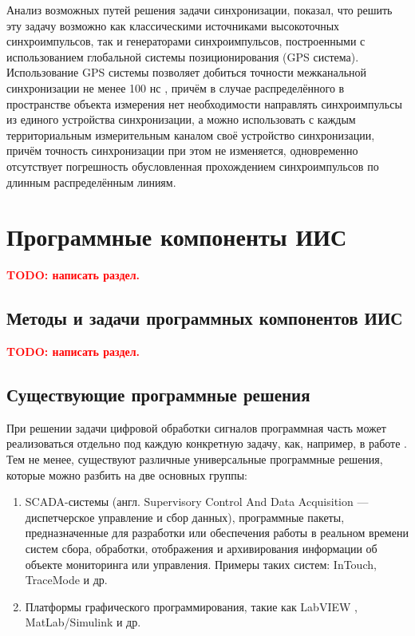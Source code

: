 \documentclass[a4paper, 14pt, titlepage]{extarticle}
\newcommand{\todo}[1]{\textbf{\textcolor{red}{TODO: #1}}}
\let\oldsection\section
\renewcommand{\section}{\newpage\oldsection}
\begin{document}

  Анализ возможных путей решения задачи синхронизации, показал, что решить эту задачу возможно как
  классическими источниками высокоточных синхроимпульсов, так и генераторами синхроимпульсов,
  построенными с использованием глобальной системы позиционирования (GPS система). Использование GPS
  системы позволяет добиться точности межканальной синхронизации не менее 100 нс \cite{lombardi-gps}, причём в случае
  распределённого в пространстве объекта измерения нет необходимости направлять синхроимпульсы из
  единого устройства синхронизации, а можно использовать с каждым территориальным измерительным
  каналом своё устройство синхронизации, причём точность синхронизации при этом не изменяется,
  одновременно отсутствует погрешность обусловленная прохождением синхроимпульсов по длинным
  распределённым линиям.

  \section{Программные компоненты ИИС}

  \todo{написать раздел.}

  \subsection{Методы и задачи программных компонентов ИИС}

  \todo{написать раздел.}

  \subsection{Существующие программные решения}\label{ssec:existing}

  При решении задачи цифровой обработки сигналов программная часть может реализоваться отдельно под
  каждую конкретную задачу, как, например, в работе \cite{bak-autometry}.
  Тем не менее, существуют различные универсальные программные решения, которые можно разбить на две
  основных группы:
  \begin{enumerate}
    \item SCADA-системы (англ. Supervisory Control And Data Acquisition — диспетчерское управление и
      сбор данных), программные пакеты, предназначенные для разработки или обеспечения работы в
      реальном времени систем сбора, обработки, отображения и архивирования информации об объекте
      мониторинга или управления. \cite{boyer-scada}
      Примеры таких систем: InTouch, TraceMode и др.
    \item Платформы графического программирования, такие как LabVIEW \cite{lavrov-labview}, MatLab/Simulink и др.
  \end{enumerate}
\end{document}
